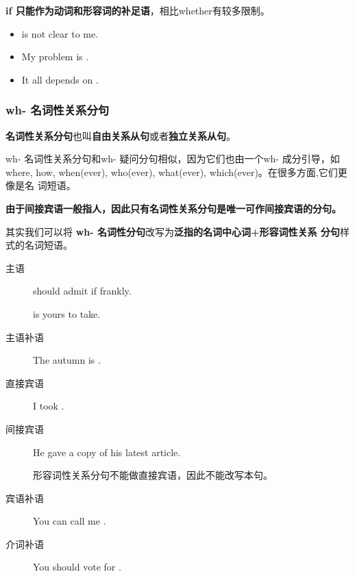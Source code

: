 \textbf{if 只能作为动词和形容词的补足语}，相比whether有较多限制。

\begin{itemize}
\item {} is not clear to me.

\item My problem is .

\item It all depends on .
\end{itemize}

\subsubsection{wh- 名词性关系分句}
\label{subsubsec:whnoun}

\textbf{名词性关系分句}也叫\textbf{自由关系从句}或者\textbf{独立关系从句}。

wh- 名词性关系分句和wh- 疑问分句相似，因为它们也由一个wh- 成分引导，如where,
how, when(ever), who(ever), what(ever), which(ever)。在很多方面,它们更像是名
词短语。

\textbf{由于间接宾语一般指人，因此只有名词性关系分句是唯一可作间接宾语的分句。}

其实我们可以将 \textbf{wh- 名词性分句}改写为\textbf{泛指的名词中心词+形容词性关系
  分句}样式的名词短语。
\begin{description}
\item[主语]  should admit if frankly.

   is yours to take.
\item[主语补语] The autumn is .
\item[直接宾语] I took .
\item[间接宾语] He gave  a copy of his latest
  article.

  形容词性关系分句不能做直接宾语，因此不能改写本句。
\item[宾语补语] You can call me .
\item[介词补语] You should vote for .
\end{description}

